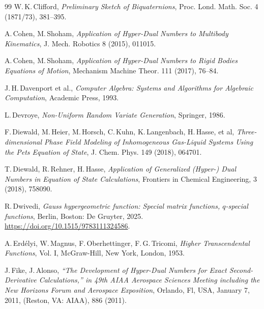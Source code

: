 \documentclass[11pt,a4paper,fleqn]{article}
\numberwithin{equation}{section}
\numberwithin{lemma}{section}
\numberwithin{theorem}{section}
\numberwithin{corollary}{section}
\begin{document}
\begin{thebibliography}{99}
 W.\,K.\,Clifford, \textit{Preliminary Sketch of Biquaternions}, Proc. Lond. Math. Soc. 4 (1871/73), 381--395.

 A.\,Cohen, M.\,Shoham,  \textit{Application of Hyper-Dual Numbers to Multibody Kinematics}, J. Mech. Robotics 8 (2015), 011015. 

 A.\,Cohen, M.\,Shoham, \textit{Application of Hyper-Dual Numbers to Rigid Bodies Equations of Motion}, Mechanism Machine Theor. 111 (2017), 76--84. 


 J.\,H.\,Davenport et al., \textit{Computer Algebra: Systems and Algorithms for Algebraic Computation}, Academic Press, 1993.

 L.\,Devroye, \textit{Non-Uniform Random Variate Generation}, Springer, 1986.


 F.\,Diewald, M.\,Heier, M.\,Horsch, C.\,Kuhn,  K.\,Langenbach, H.\,Hasse,  et al, \textit{Three-dimensional Phase Field Modeling of Inhomogeneous Gas-Liquid Systems Using the Pets Equation of State}, J. Chem. Phys. 149 (2018), 064701.

 T.\,Diewald, R.\,Rehner, H.\,Hasse,  \textit{Application of Generalized (Hyper-) Dual Numbers in Equation of State Calculations}, Frontiers in Chemical Engineering, 3 (2018), 758090. 

 R.\,Dwivedi, \textit{Gauss hypergeometric function: Special matrix functions, $q$-special functions}, Berlin, Boston: De Gruyter, 2025. \url{https://doi.org/10.1515/9783111324586}.


 A.\,Erd\'elyi, W.\,Magnus, F.\,Oberhettinger, F.\,G.\,Tricomi, \textit{Higher Transcendental Functions}, Vol. I, McGraw-Hill, New York, London, 1953.


 J.\,Fike, J.\,Alonso,  \textit{“The Development of Hyper-Dual Numbers for Exact Second-Derivative Calculations,” in 49th AIAA Aerospace Sciences Meeting including the New Horizons Forum and Aerospace Exposition}, Orlando, Fl, USA, January 7, 2011, (Reston, VA: AIAA), 886 (2011). 


\end{thebibliography}
\end{document}
